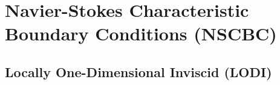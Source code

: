 




\section{Navier-Stokes Characteristic Boundary Conditions (NSCBC)}




\subsection{Locally One-Dimensional Inviscid (LODI)}


